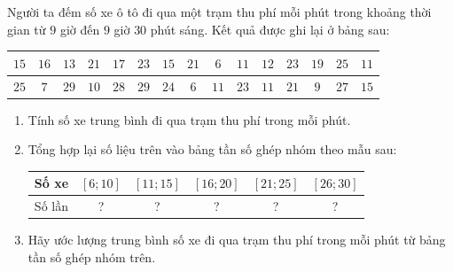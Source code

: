 \begin{ex}%
	Người ta đếm số xe ô tô đi qua một trạm thu phí mỗi phút trong  khoảng thời gian từ $9$ giờ đến $9$ giờ $30$ phút sáng. Kết quả được ghi lại ở bảng sau:
	\begin{center}
		\begin{tabular}{|c|c|c|c|c|c|c|c|c|c|c|c|c|c|c|}
			 \hline
			$15$ & $16$ & $13$ & $21$ & $17$ & $23$ & $15$ & $21$ & $6$ & $11$ & $12$ & $23$  & $19$ & $25$ & $11$ \\
			\hline 
			$25$ & $7$ & $29$ &  $10$ & $28$ & $29$ & $24$ & $6$ & $11$ & $23$ & $11$ & $21$ & $9$ & $27$ & $15$ \\
			 \hline
		\end{tabular}
	\end{center}
	\begin{enumerate}
		\item Tính số xe trung bình đi qua trạm  thu phí trong mỗi phút.
		\item Tổng hợp lại số liệu trên vào bảng tần số ghép nhóm theo mẫu sau: 
		\begin{center}
			\begin{tabular}{|c|c|c|c|c|c|}
				\hline 
				Số xe & $[6;10]$ & $[11;15]$ & $[16;20]$ & $[21;25]$ & $[26;30]$ \\ 
				 \hline
				Số lần &? &?  &? &? &? \\
				 \hline
			\end{tabular}
		\end{center}
		\item Hãy ước lượng trung bình số xe đi qua trạm thu phí trong mỗi phút từ  bảng tần số ghép nhóm trên.
	\end{enumerate}
\end{ex}
